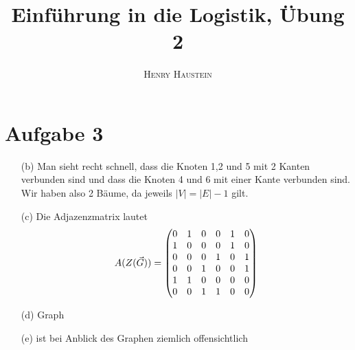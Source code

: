 \documentclass{article}
\title{\textbf{Einführung in die Logistik, Übung 2}}
\author{\textsc{Henry Haustein}}
\date{}
\begin{document}
	\maketitle
	
	\section*{Aufgabe 3}
	\begin{enumerate}[label=(\alph*)]
		\item[(b)] Man sieht recht schnell, dass die Knoten 1,2 und 5 mit 2 Kanten verbunden sind und dass die Knoten 4 und 6 mit einer Kante verbunden sind. Wir haben also 2 Bäume, da jeweils $\vert V\vert = \vert E\vert - 1$ gilt.
		\item[(c)] Die Adjazenzmatrix lautet
		\begin{align}
			A(Z(\vec{G}))=\begin{pmatrix}
				0 & 1 & 0 & 0 & 1 & 0 \\
				1 & 0 & 0 & 0 & 1 & 0 \\
				0 & 0 & 0 & 1 & 0 & 1 \\
				0 & 0 & 1 & 0 & 0 & 1 \\
				1 & 1 & 0 & 0 & 0 & 0 \\
				0 & 0 & 1 & 1 & 0 & 0
			\end{pmatrix} \notag
		\end{align}
		\item[(d)] Graph
		\begin{center}
		\end{center}
		\item[(e)] ist bei Anblick des Graphen ziemlich offensichtlich
	\end{enumerate}
\end{document}
